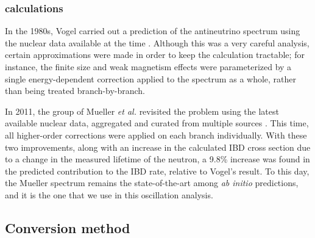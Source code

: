 \documentclass[../thesis.tex]{subfiles}
\begin{document}
\subsubsection{\ureight calculations}
\label{sec:vogel}

In the 1980s, Vogel carried out a prediction of the \ureight antineutrino spectrum using the nuclear data available at the time \cite{PhysRevC.24.1543}. Although this was a very careful analysis, certain approximations were made in order to keep the calculation tractable; for instance, the finite size and weak magnetism effects were parameterized by a single energy-dependent correction applied to the spectrum as a whole, rather than being treated branch-by-branch.

In 2011, the group of Mueller \emph{et al.} revisited the problem using the latest available nuclear data, aggregated and curated from multiple sources \cite{PhysRevC.83.054615}. This time, all higher-order corrections were applied on each branch individually. With these two improvements, along with an increase in the calculated IBD cross section due to a change in the measured lifetime of the neutron, a 9.8\% increase was found in the predicted \ureight contribution to the IBD rate, relative to Vogel's result. To this day, the Mueller spectrum remains the state-of-the-art among \ureight \emph{ab initio} predictions, and it is the one that we use in this oscillation analysis.

\subsection{Conversion method}
\label{sec:conversion}
\end{document}
